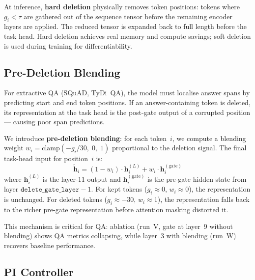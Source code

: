\documentclass[11pt,a4paper]{article}
\begin{document}
At inference, \textbf{hard deletion} physically removes token positions: tokens where $g_i < \tau$ are gathered out of the sequence tensor before the remaining encoder layers are applied. The reduced tensor is expanded back to full length before the task head. Hard deletion achieves real memory and compute savings; soft deletion is used during training for differentiability.


\subsection{Pre-Deletion Blending}
\label{sec:pre-deletion-blending}

For extractive QA (SQuAD, TyDi~QA), the model must localise answer spans by predicting start and end token positions. If an answer-containing token is deleted, its representation at the task head is the post-gate output of a corrupted position --- causing poor span predictions.

We introduce \textbf{pre-deletion blending}: for each token~$i$, we compute a blending weight $w_i = \text{clamp}(-g_i / 30,\; 0,\; 1)$ proportional to the deletion signal. The final task-head input for position~$i$ is:
\begin{equation}
    \tilde{\mathbf{h}}_i = (1 - w_i) \cdot \mathbf{h}_i^{(L)} + w_i \cdot \mathbf{h}_i^{(\text{gate})}
    \label{eq:blending}
\end{equation}
where $\mathbf{h}_i^{(L)}$ is the layer-11 output and $\mathbf{h}_i^{(\text{gate})}$ is the pre-gate hidden state from layer $\texttt{delete\_gate\_layer} - 1$. For kept tokens ($g_i \approx 0$, $w_i \approx 0$), the representation is unchanged. For deleted tokens ($g_i \approx -30$, $w_i \approx 1$), the representation falls back to the richer pre-gate representation before attention masking distorted it.

This mechanism is critical for QA: ablation (run~V, gate at layer~9 without blending) shows QA metrics collapsing, while layer~3 with blending (run~W) recovers baseline performance.


\subsection{PI Controller}
\label{sec:pi-controller}
\end{document}
